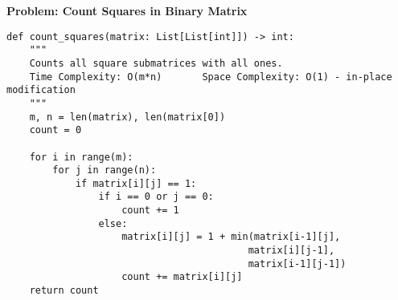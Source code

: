 \noindent\textbf{Problem: Count Squares in Binary Matrix}
\begin{verbatim}
def count_squares(matrix: List[List[int]]) -> int:
    """
    Counts all square submatrices with all ones.
    Time Complexity: O(m*n)       Space Complexity: O(1) - in-place modification
    """
    m, n = len(matrix), len(matrix[0])
    count = 0
    
    for i in range(m):
        for j in range(n):
            if matrix[i][j] == 1:
                if i == 0 or j == 0:
                    count += 1
                else:
                    matrix[i][j] = 1 + min(matrix[i-1][j], 
                                          matrix[i][j-1],
                                          matrix[i-1][j-1])
                    count += matrix[i][j]
    return count
\end{verbatim}

